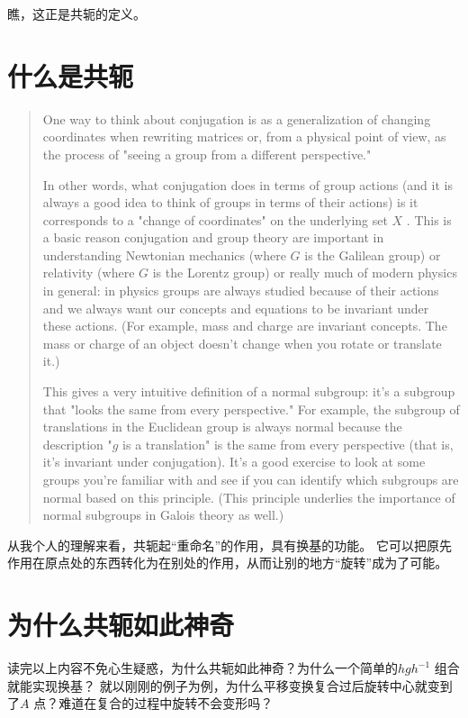 \documentclass{ctexrep}
\begin{document}
瞧，这正是共轭的定义。

\section{什么是共轭}

\begin{quotation}
    One way to think about conjugation is as a
    generalization of changing coordinates when rewriting
    matrices or, from a physical point of view, as the
    process of "seeing a group from a different perspective."

    In other words, what conjugation does in terms of group
    actions (and it is always a good idea to think of groups in
    terms of their actions) is it corresponds to a "change of
    coordinates" on the underlying set \(X\)
    . This is a basic reason conjugation and group theory are
    important in understanding Newtonian mechanics (where \(G\)
    is the Galilean group) or relativity (where \(G\)
    is the Lorentz group) or really much of modern physics in
    general: in physics groups are always studied because of
    their actions and we always want our concepts and equations
    to be invariant under these actions. (For example, mass and
        charge are invariant concepts. The mass or charge of an
    object doesn't change when you rotate or translate it.)

    This gives a very intuitive definition of a normal
    subgroup: it's a subgroup that "looks the same from every
    perspective." For example, the subgroup of translations in
    the Euclidean group is always normal because the
    description "\(g\)
    is a translation" is the same from every perspective (that
    is, it's invariant under conjugation). It's a good exercise
    to look at some groups you're familiar with and see if you
    can identify which subgroups are normal based on this
    principle. (This principle underlies the importance of
    normal subgroups in Galois theory as well.)
\end{quotation}

从我个人的理解来看，共轭起``重命名''的作用，具有换基的功能。
它可以把原先作用在原点处的东西转化为在别处的作用，从而让别的地方``旋转''成为了可能。

\section{为什么共轭如此神奇}
读完以上内容不免心生疑惑，为什么共轭如此神奇？为什么一个简单的\(hgh^{-1}\) 组合就能实现换基？
就以刚刚的例子为例，为什么平移变换复合过后旋转中心就变到了\(A\) 点？难道在复合的过程中旋转不会变形吗？
\end{document}
